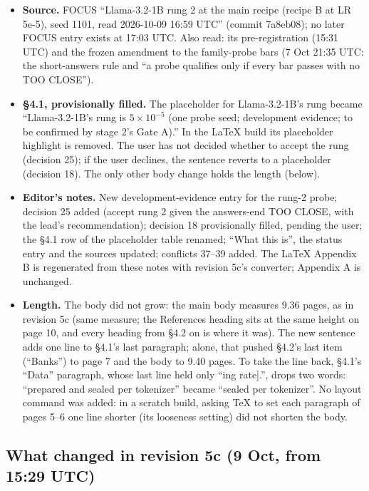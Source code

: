 \documentclass{article}
\theoremstyle{plain}
\theoremstyle{definition}
\theoremstyle{remark}
\begin{document}
\begin{itemize}
  \item \textbf{Source.} FOCUS ``Llama-3.2-1B rung 2 at the main recipe (recipe
        B at LR 5e-5), seed 1101, read 2026-10-09 16:59 UTC'' (commit 7a8eb08);
        no later FOCUS entry exists at 17:03 UTC. Also read: its
        pre-registration (15:31 UTC) and the frozen amendment to the
        family-probe bars (7 Oct 21:35 UTC: the short-answers rule and ``a probe
        qualifies only if every bar passes with no TOO CLOSE'').
  \item \textbf{\S{}4.1, provisionally filled.} The placeholder for
        Llama-3.2-1B's rung became ``Llama-3.2-1B's rung is $5 \times 10^{-5}$
        (one probe seed; development evidence; to be confirmed by stage 2's Gate
        A).'' In the LaTeX build its placeholder highlight is removed. The user
        has not decided whether to accept the rung (decision 25); if the user
        declines, the sentence reverts to a placeholder (decision 18). The only
        other body change holds the length (below).
  \item \textbf{Editor's notes.} New development-evidence entry for the rung-2
        probe; decision 25 added (accept rung 2 given the answers-end TOO CLOSE,
        with the lead's recommendation); decision 18 provisionally filled,
        pending the user; the \S{}4.1 row of the placeholder table renamed;
        ``What this is'', the status entry and the sources updated; conflicts
        37--39 added. The LaTeX Appendix B is regenerated from these notes with
        revision 5c's converter; Appendix A is unchanged.
  \item \textbf{Length.} The body did not grow: the main body measures 9.36
        pages, as in revision 5c (same measure; the References heading sits at
        the same height on page 10, and every heading from \S{}4.2 on is where
        it was). The new sentence adds one line to \S{}4.1's last paragraph;
        alone, that pushed \S{}4.2's last item (``Banks'') to page 7 and the
        body to 9.40 pages. To take the line back, \S{}4.1's ``Data'' paragraph,
        whose last line held only ``ing rate].'', drops two words: ``prepared
        and sealed per tokenizer'' became ``sealed per tokenizer''. No layout
        command was added: in a scratch build, asking TeX to set each paragraph
        of pages 5--6 one line shorter (its looseness setting) did not shorten
        the body.
\end{itemize}

\subsection{What changed in revision 5c (9 Oct, from 15:29 UTC)}
\end{document}
